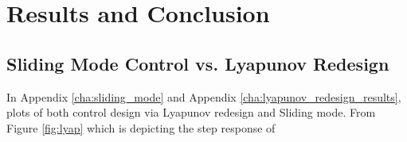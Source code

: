 \section{Results and Conclusion} %
\label{sec:results_and_conclusion}

\subsection{Sliding Mode Control vs. Lyapunov Redesign} %
\label{sub:sliding_mode_control_vs_lyapunov_redesign}
In Appendix \ref{cha:sliding_mode} and Appendix \ref{cha:lyapunov_redesign_results}, plots of both control design via
Lyapunov redesign and Sliding mode. From Figure \ref{fig:lyap} which is depicting the step response of 
